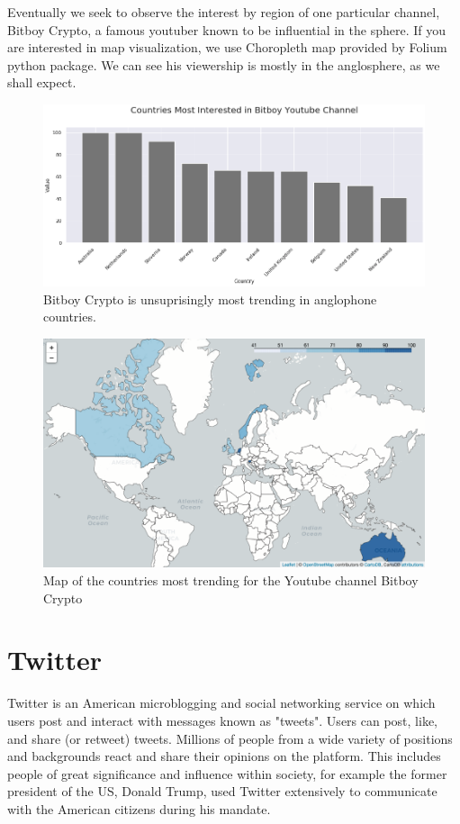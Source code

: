 \documentclass[twoside]{report}
\begin{document}
\begin{spacing}{1}
Eventually we seek to observe the interest by region of one particular channel, Bitboy Crypto, a famous youtuber known to be influential in the sphere. If you are interested in map visualization, we use Choropleth map provided by Folium python package. We can see his viewership is mostly in the anglosphere, as we shall expect.

\begin{figure}[!htbp]
    \centering
    \includegraphics[scale = 0.5]{Images/countries_rank_bitboy_crypto_youtube.png}
    \caption{Bitboy Crypto is unsuprisingly most trending in anglophone countries.}
    \label{countries_rank_bitboy_crypto_youtube}
\end{figure}

\begin{figure}[!htbp]
    \centering
    \includegraphics[scale = 0.4]{Images/countries_map_2.png}
    \caption{Map of the countries most trending for the Youtube channel Bitboy Crypto}
    \label{countries_map_2}
\end{figure}


\section{Twitter}
Twitter is an American microblogging and social networking service on which users post and interact with messages known as "tweets". Users can post, like, and share (or retweet) tweets. Millions of people from a wide variety of positions and backgrounds react and share their opinions on the platform. This includes people of great significance  and influence within society, for example the former president of the US, Donald Trump, used Twitter extensively to communicate with the American citizens during his mandate.


\end{spacing}
\end{document}
